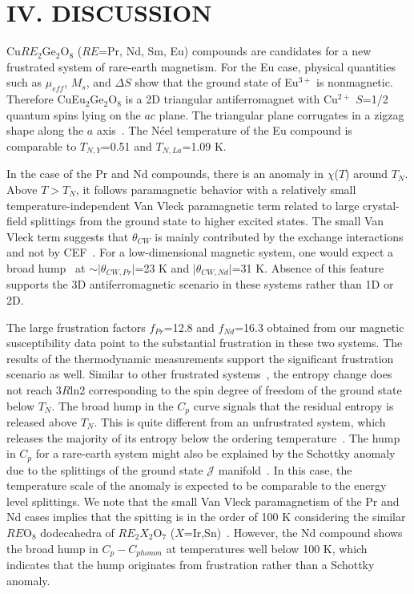 \documentclass[aps,prl,reprint,amsmath,amssymb,superscriptaddress,showpacs]{revtex4-1}
\begin{document}
\section{IV. DISCUSSION}
Cu$RE_2$Ge$_2$O$_8$ ($RE$=Pr, Nd, Sm, Eu) compounds are candidates for a new frustrated system of rare-earth magnetism. For the Eu case, physical quantities such as $\mu_{eff}$, $M_s$, and $\Delta$$S$ show that the ground state of Eu$^{3+}$ is nonmagnetic. Therefore CuEu$_2$Ge$_2$O$_8$ is a 2D triangular antiferromagnet with Cu$^{2+}$ $S$=1/2 quantum spins lying on the $ac$ plane. The triangular plane corrugates in a zigzag shape along the $a$ axis~\cite{H.Cho2017}. The N\'eel temperature of the Eu compound is comparable to $T_{N,Y}$=0.51 and $T_{N,La}$=1.09 K.

In the case of the Pr and Nd compounds, there is an anomaly in $\chi$($T$) around $T_N$. Above $T>T_N$, it follows paramagnetic behavior with a relatively small temperature-independent Van Vleck paramagnetic term related to large crystal-field splittings from the ground state to higher excited states. The small Van Vleck term suggests that $\theta_{CW}$ is mainly contributed by the exchange interactions and not by CEF~\cite{S.Nakatsuji2006}.  
For a low-dimensional magnetic system, one would expect a broad hump~\cite{J.Bonner1964,M.Hase1993,B.Koteswararao2007,N.kini2006,N.Elstner1993} at $\sim$$\lvert\theta_{CW,Pr}\rvert$=23 K and $\lvert\theta_{CW,Nd}\rvert$=31 K. Absence of this feature supports the 3D antiferromagnetic scenario in these systems rather than 1D or 2D. 

The large frustration factors $f_{Pr}$=12.8 and $f_{Nd}$=16.3 obtained from our magnetic susceptibility data point to the substantial frustration in these two systems. The results of the thermodynamic measurements support the significant frustration scenario as well. Similar to other frustrated systems~\cite{T.Radu2005,B.Canals2016}, the entropy change does not reach 3$R$ln2 corresponding to the spin degree of freedom of the ground state below $T_N$. The broad hump in the $C_p$ curve signals that the residual entropy is released above $T_N$. This is quite different from an unfrustrated system, which releases the majority of its entropy below the ordering temperature~\cite{V.Goruganti2008}. The hump in $C_p$ for a rare-earth system might also be explained by the Schottky anomaly due to the splittings of the ground state $\mathcal{J}$ manifold~\cite{E.Gopal1966}. In this case, the temperature scale of the anomaly is expected to be comparable to the energy level splittings. We note that the small Van Vleck paramagnetism of the Pr and Nd cases implies that the spitting is in the order of 100 K considering the similar $RE$O$_8$ dodecahedra of $RE_2X_2$O$_7$ ($X$=Ir,Sn)~\cite{S.Nakatsuji2006,H.Zhou2008,M.Watahiki2011}. However, the Nd compound shows the broad hump in $C_p-C_{phonon}$ at temperatures well below 100 K, which indicates that the hump originates from frustration rather than a Schottky anomaly.
\end{document}
